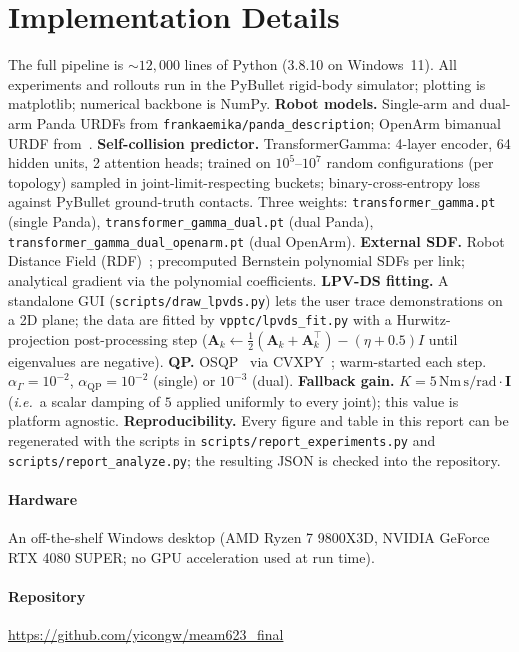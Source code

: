 \documentclass[10pt,conference]{IEEEtran}
\newcommand{\bA}{\bm{A}}
\theoremstyle{remark}
\theoremstyle{plain}
\begin{document}
\section{Implementation Details}
\label{sec:impl}

The full pipeline is ${\sim}12{,}000$ lines of Python (3.8.10
on Windows~11). All experiments and rollouts run in the
PyBullet rigid-body simulator;
plotting is matplotlib; numerical
backbone is NumPy.
\textbf{Robot models.} Single-arm and dual-arm Panda URDFs from
\texttt{frankaemika/panda\_description}; OpenArm bimanual URDF
from~\cite{enactic2025openarm}.
\textbf{Self-collision predictor.} TransformerGamma:
4-layer encoder, 64 hidden units, 2 attention heads;
trained on $10^5$--$10^7$ random configurations (per topology)
sampled in
joint-limit-respecting buckets; binary-cross-entropy loss against
PyBullet ground-truth contacts. Three weights:
\texttt{transformer\_gamma.pt} (single Panda),
\texttt{transformer\_gamma\_dual.pt} (dual Panda),
\texttt{transformer\_gamma\_dual\_openarm.pt} (dual OpenArm).
\textbf{External SDF.} Robot Distance Field
(RDF)~\cite{li2024rdf}; precomputed Bernstein polynomial SDFs
per link; analytical gradient via the polynomial coefficients.
\textbf{LPV-DS fitting.} A standalone GUI
(\texttt{scripts/draw\_lpvds.py}) lets the user trace
demonstrations on a 2D plane; the data are fitted by
\texttt{vpptc/lpvds\_fit.py} with a Hurwitz-projection
post-processing step ($\bA_k \!\leftarrow\! \tfrac12(\bA_k +
\bA_k^\top) - (\eta + 0.5)I$ until eigenvalues are negative).
\textbf{QP.} OSQP~\cite{osqp} via CVXPY~\cite{cvxpy}; warm-started
each step. $\alpha_\Gamma{=}10^{-2}$, $\alpha_{\text{QP}}{=}
10^{-2}$ (single) or $10^{-3}$ (dual).
\textbf{Fallback gain.} $K=5\,\mathrm{Nm\,s/rad}\cdot\bm{I}$
(\emph{i.e.}\ a scalar damping of $5$ applied uniformly to every
joint); this value is platform agnostic.
\textbf{Reproducibility.} Every figure and table in this report
can be regenerated with the scripts in
\texttt{scripts/report\_experiments.py} and
\texttt{scripts/report\_analyze.py}; the resulting JSON is
checked into the repository.

\paragraph*{Hardware} An off-the-shelf Windows desktop
(AMD Ryzen 7 9800X3D, NVIDIA GeForce RTX 4080 SUPER; no GPU acceleration used at run time).

\paragraph*{Repository}
\url{https://github.com/yicongw/meam623_final}
\end{document}
